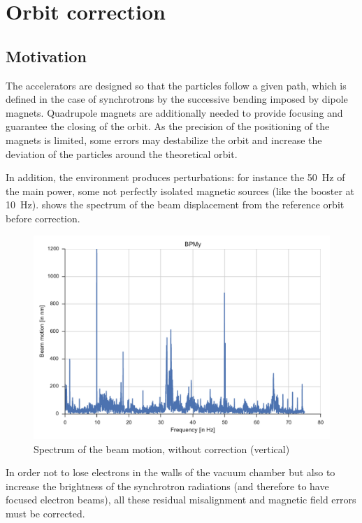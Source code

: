 
\chapter{Orbit correction}
\label{sec:correction}

\section{Motivation}
The accelerators are designed so that the particles follow a given path, which is defined in the case of synchrotrons by the successive bending imposed by dipole magnets. Quadrupole magnets are additionally needed to provide focusing and guarantee the closing of the orbit. As the precision of the positioning of the magnets is limited, some errors may destabilize the orbit and increase the deviation of the particles around the theoretical orbit.

In addition, the environment produces perturbations: for instance the 50~Hz of the main power, some not perfectly isolated magnetic sources (like the booster at \SI{10}{\hertz}).  shows the spectrum of the beam displacement from the reference orbit before correction. 
\begin{figure}
	\centering
	\includegraphics[width=.9\linewidth]{img/fft_no_corr}
	\caption{\label{fig:fft_no_correction} Spectrum of the beam motion, without correction (vertical)}
\end{figure}

In order not to lose electrons in the walls of the vacuum chamber but also to increase the brightness of the synchrotron radiations (and therefore to have focused electron beams), all these residual misalignment and magnetic field errors must be corrected.

